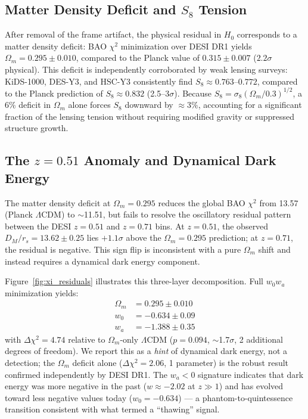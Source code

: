 \documentclass[twocolumn]{aastex631}
\begin{document}
\subsection{Matter Density Deficit and $S_8$ Tension}

After removal of the frame artifact, the physical residual in $H_0$ corresponds
to a matter density deficit: BAO $\chi^2$ minimization over DESI DR1 yields
$\Omega_m = 0.295 \pm 0.010$, compared to the Planck value of $0.315 \pm 0.007$
($2.2\sigma$ physical).
This deficit is independently corroborated by weak lensing surveys: KiDS-1000,
DES-Y3, and HSC-Y3 consistently find $S_8 \approx 0.763$--$0.772$, compared to
the Planck prediction of $S_8 \approx 0.832$ (2.5--3$\sigma$).
Because $S_8 = \sigma_8 (\Omega_m / 0.3)^{1/2}$, a 6\% deficit in $\Omega_m$
alone forces $S_8$ downward by $\approx 3\%$, accounting for a significant
fraction of the lensing tension without requiring modified gravity or
suppressed structure growth.

\subsection{The $z = 0.51$ Anomaly and Dynamical Dark Energy}

The matter density deficit at $\Omega_m = 0.295$ reduces the global BAO $\chi^2$
from 13.57 (Planck $\Lambda$CDM) to $\sim$11.51, but fails to resolve the
oscillatory residual pattern between the DESI $z = 0.51$ and $z = 0.71$ bins.
At $z = 0.51$, the observed $D_M/r_s = 13.62 \pm 0.25$ lies $+1.1\sigma$ above
the $\Omega_m = 0.295$ prediction; at $z = 0.71$, the residual is negative.
This sign flip is inconsistent with a pure $\Omega_m$ shift and instead requires
a dynamical dark energy component.

Figure~\ref{fig:xi_residuals} illustrates this three-layer decomposition.
Full $w_0 w_a$ minimization yields:
\begin{align}
  \Omega_m &= 0.295 \pm 0.010 \\
  w_0      &= -0.634 \pm 0.09 \\
  w_a      &= -1.388 \pm 0.35
\end{align}
with $\Delta\chi^2 = 4.74$ relative to $\Omega_m$-only $\Lambda$CDM
($p = 0.094$, $\sim$1.7$\sigma$, 2 additional degrees of freedom).
We report this as a \emph{hint} of dynamical dark energy, not a detection;
the $\Omega_m$ deficit alone ($\Delta\chi^2 = 2.06$, 1 parameter) is the
robust result confirmed independently by DESI DR1.
The $w_a < 0$ signature indicates that dark energy was more negative in the past
($w \approx -2.02$ at $z \gg 1$) and has evolved toward less negative values today
($w_0 = -0.634$) --- a phantom-to-quintessence transition consistent with what
\citet{DESI_2024_DR1} termed a ``thawing'' signal.
\end{document}
